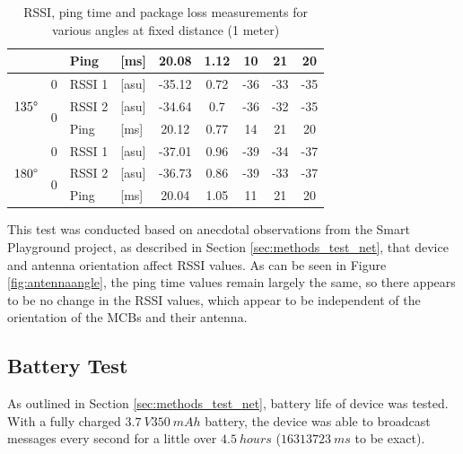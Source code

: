 \begin{table}[H]
\begin{tabular}{|c|c|l|l|c|c|c|c|c|}
        && Ping & [ms] & 20.08 & 1.12 & 10 & 21 & 20 \\\hline\hline
        \multirow{3}{*}{$135\degree$} & \multirow{1}{*}{0} & RSSI 1 & [asu] & -35.12 & 0.72 & -36 & -33 & -35 \\\cline{2-9}\cline{2-9}
        & \multirow{2}{*}{0} & RSSI 2 & [asu] & -34.64 & 0.7 & -36 & -32 & -35 \\\cline{3-9}
        && Ping & [ms] & 20.12 & 0.77 & 14 & 21 & 20 \\\hline\hline
        \multirow{3}{*}{$180\degree$} & \multirow{1}{*}{0} & RSSI 1 & [asu] & -37.01 & 0.96 & -39 & -34 & -37 \\\cline{2-9}\cline{2-9}
        & \multirow{2}{*}{0} & RSSI 2 & [asu] & -36.73 & 0.86 & -39 & -33 & -37 \\\cline{3-9}
        && Ping & [ms] & 20.04 & 1.05 & 11 & 21 & 20 \\\hline
    \end{tabular}
    \vspace{\ftspace}
    \caption{RSSI, ping time and package loss measurements for various angles at fixed distance (1 meter)}
    \label{tab:angle_res}
\end{table}

This test was conducted based on anecdotal observations from the Smart Playground project, as described in Section \ref{sec:methods_test_net}, that device and antenna orientation affect RSSI values. As can be seen in Figure \ref{fig:antennaangle}, the ping time values remain largely the same, so there appears to be no change in the RSSI values, which appear to be independent of the orientation of the MCBs and their antenna.

\subsection{\label{sec:res_battery}Battery Test}

As outlined in Section \ref{sec:methods_test_net}, battery life of device was tested. With a fully charged $3.7\ V 350\ mAh$ battery, the device was able to broadcast messages every second for a little over $4.5\ hours$ ($16313723\ ms$ to be exact). %

